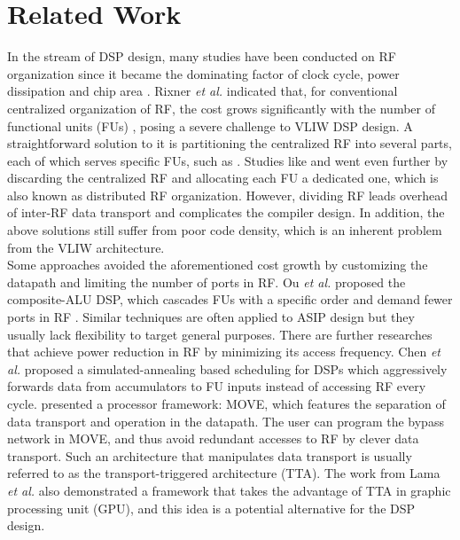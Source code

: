 \chapter{Related Work}
\label{cha:related}
    In the stream of DSP design, many studies have been conducted on RF organization since it became the dominating factor of clock cycle, power dissipation and chip area \cite{register}.
    Rixner \textit{et al.} indicated that, for conventional centralized organization of RF, the cost grows significantly with the number of functional units (FUs) \cite{register}, posing a severe challenge to VLIW DSP design.
    A straightforward solution to it is partitioning the centralized RF into several parts, each of which serves specific FUs, such as \cite{cluster}.
    Studies like \cite{synzen} and \cite{dsplite} went even further by discarding the centralized RF and allocating each FU a dedicated one, which is also known as distributed RF organization.
    However, dividing RF leads overhead of inter-RF data transport and complicates the compiler design.
    In addition, the above solutions still suffer from poor code density, which is an inherent problem from the VLIW architecture.
    \\\indent
    Some approaches avoided the aforementioned cost growth by customizing the datapath and limiting the number of ports in RF.
    Ou \textit{et al.} proposed the composite-ALU DSP, which cascades FUs with a specific order and demand fewer ports in RF \cite{cascade} \cite{hearaid}.
    Similar techniques are often applied to ASIP design but they usually lack flexibility to target general purposes.
    There are further researches that achieve power reduction in RF by minimizing its access frequency.
    Chen \textit{et al.} proposed a simulated-annealing based scheduling for DSPs which aggressively forwards data from accumulators to FU inputs instead of accessing RF every cycle\cite{multistage}.
    \cite{move} presented a processor framework: MOVE, which features the separation of data transport and operation in the datapath. 
    The user can program the bypass network in MOVE, and thus avoid redundant accesses to RF by clever data transport.
    Such an architecture that manipulates data transport is usually referred to as the transport-triggered architecture (TTA).
    The work from Lama \textit{et al.} \cite{ttagpu} also demonstrated a framework that takes the advantage of TTA in graphic processing unit (GPU), and this idea is a potential alternative for the DSP design.
    \\\indent
